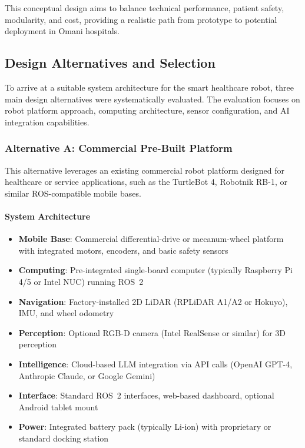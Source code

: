 This conceptual design aims to balance technical performance, patient safety, modularity, and cost, providing a realistic path from prototype to potential deployment in Omani hospitals.

\subsection{Design Alternatives and Selection}
To arrive at a suitable system architecture for the smart healthcare robot, three main design alternatives were systematically evaluated. The evaluation focuses on robot platform approach, computing architecture, sensor configuration, and AI integration capabilities.

\subsubsection{Alternative A: Commercial Pre-Built Platform}
This alternative leverages an existing commercial robot platform designed for healthcare or service applications, such as the TurtleBot 4, Robotnik RB-1, or similar ROS-compatible mobile bases.

\paragraph{System Architecture}
\begin{itemize}
    \item \textbf{Mobile Base}: Commercial differential-drive or mecanum-wheel platform with integrated motors, encoders, and basic safety sensors
    \item \textbf{Computing}: Pre-integrated single-board computer (typically Raspberry Pi 4/5 or Intel NUC) running ROS~2
    \item \textbf{Navigation}: Factory-installed 2D LiDAR (RPLiDAR A1/A2 or Hokuyo), IMU, and wheel odometry
    \item \textbf{Perception}: Optional RGB-D camera (Intel RealSense or similar) for 3D perception
    \item \textbf{Intelligence}: Cloud-based LLM integration via API calls (OpenAI GPT-4, Anthropic Claude, or Google Gemini)
    \item \textbf{Interface}: Standard ROS~2 interfaces, web-based dashboard, optional Android tablet mount
    \item \textbf{Power}: Integrated battery pack (typically Li-ion) with proprietary or standard docking station
\end{itemize}

